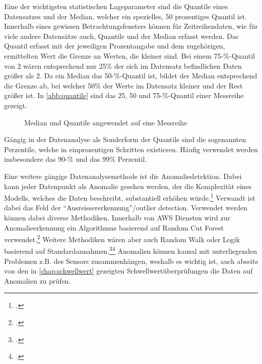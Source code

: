Eine der wichtigsten statistischen Lageparameter sind die Quantile eines Datensatzes und der Median, welcher ein spezielles, 50 prozentiges Quantil ist. 
Innerhalb eines gewissen Betrachtungsfensters können für Zeitreihendaten, wie für viele andere Datensätze auch, Quantile und der Median erfasst werden. 
Das Quantil erfasst mit der jeweiligen Prozentangabe und dem zugehörigen, ermittelten Wert die Grenze an Werten, die kleiner sind. 
Bei einem 75-\%-Quantil von $2$ wären entsprechend nur 25\% der sich im Datensatz befindlichen Daten größer als $2$. 
Da ein Median das 50-\%-Quantil ist, bildet der Median entsprechend die Grenze ab, bei welcher 50\% der Werte im Datensatz kleiner und der Rest größer ist. In \autoref{abb:quantile} sind das 25, 50 und 75-\%-Quantil einer Messreihe gezeigt.
\begin{figure}[H]
\centering
{}
\caption{Median und Quantile angewendet auf eine Messreihe}
\label{abb:quantile}
\end{figure}

Gängig in der Datenanalyse als Sonderform der Quantile sind die sogenannten Perzentile, welche in einprozentigen Schritten existieren. Häufig verwendet werden insbesondere das 90-\% und das 99\% Perzentil.

Eine weitere gängige Datenanalysemethode ist die Anomaliedetektion. 
Dabei kann jeder Datenpunkt als Anomalie gesehen werden, der die Komplexität eines Modells, welches die Daten beschreibt, substantiell erhöhen würde.\footcite[Vgl.][]{Guha.2016} Verwandt ist dabei das Feld der \enquote{Ausreissererkennung}/outlier detection. 
Verwendet werden können dabei diverse Methodiken. Innerhalb von \ac{AWS} Diensten wird zur Anomalieerkennung ein Algorithmus basierend auf Random Cut Forest verwendet.\footcite[Vgl.][1]{Guha.2016} Weitere Methodiken wären aber auch Random Walk oder Logik basierend auf Standardannahmen.\footcite[Vgl.][]{Moonesinghe.2006}\nzitat\footcite[Vgl.][]{Angiulli.2008} Anomalien können kausal mit unterliegenden Problemen z.B. des Sensors zusammenhängen, weshalb es wichtig ist, auch abseits von den in \autoref{chap:schwellwert} gezeigten Schwellwertüberprüfungen die Daten auf Anomalien zu prüfen.

